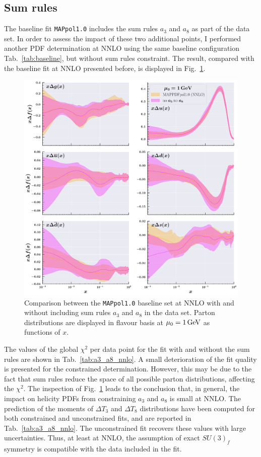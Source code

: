 \subsection*{Sum rules}
The baseline fit \texttt{MAPpol1.0} includes the sum rules $a_3$ and $a_8$ as part of the data set. In order to assess the impact of these two additional points, I performed another PDF determination at NNLO using the same baseline configuration Tab.~\ref{tab:baseline}, but without sum rules constraint. The result, compared with the baseline fit at NNLO presented before, is displayed in Fig.~\ref{fig:a3_a8_nnlo}.%

\begin{figure}[t!]
  \centering
  \includegraphics[width=\textwidth]{Chapters/Chapter_4/figs/a3_a8_nnlo.pdf}
  \caption{\small{Comparison between the \texttt{MAPpol1.0} baseline set at NNLO with and without including sum rules $a_3$ and $a_8$ in the data set. Parton distributions are displayed in flavour basis at $\mu_0 = 1 \, \textrm{GeV}$ as functions of $x$.}}
  \label{fig:a3_a8_nnlo}
\end{figure}

The values of the global $\chi^2$ per data point for the fit with and without the sum rules are shown in Tab.~\ref{tab:a3_a8_nnlo}. A small deterioration of the fit quality is presented for the constrained determination. However, this may be due to the fact that sum rules reduce the space of all possible parton distributions, affecting the $\chi^2$. The inspection of Fig.~\ref{fig:a3_a8_nnlo} leads to the conclusion that, in general, the impact on helicity PDFs from constraining $a_3$ and $a_8$ is small at NNLO. The prediction of the moments of $\Delta T_3$ and $\Delta T_8$ distributions have been computed for both constrained and unconstrained fits, and are reported in Tab.~\ref{tab:a3_a8_nnlo}. The unconstrained fit recovers these values with large uncertainties. Thus, at least at NNLO, the assumption of exact $SU(3)_f$ symmetry is compatible with the data included in the fit.%

